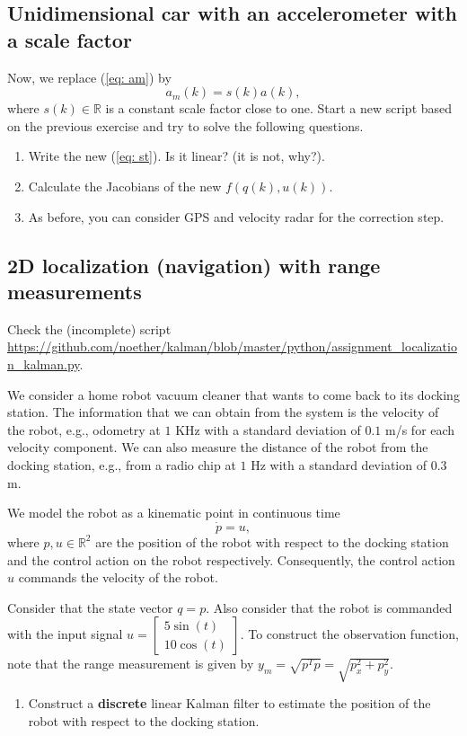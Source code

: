 \documentclass[11pt,a4paper]{article}
\begin{document}
\subsection{Unidimensional car with an accelerometer with a scale factor}
Now, we replace (\ref{eq: am}) by
\begin{equation}
	a_m(k) = s(k)a(k),
\end{equation}
where $s(k)\in\mathbb{R}$ is a constant scale factor close to one.
Start a new script based on the previous exercise and try to solve the following questions.
\begin{enumerate}
	\item Write the new (\ref{eq: st}). Is it linear? (it is not, why?).
	\item Calculate the Jacobians of the new $f(q(k), u(k))$.
	\item As before, you can consider GPS and velocity radar for the correction step.
\end{enumerate}

\subsection{2D localization (navigation) with range measurements}
Check the (incomplete) script \url{https://github.com/noether/kalman/blob/master/python/assignment_localization_kalman.py}.

We consider a home robot vacuum cleaner that wants to come back to its docking station. The information that we can obtain from the system is the velocity of the robot, e.g., odometry at $1$ KHz with a standard deviation of $0.1$ m/s for each velocity component. We can also measure the distance of the robot from the docking station, e.g., from a radio chip at $1$ Hz with a standard deviation of $0.3$ m.

We model the robot as a kinematic point in continuous time
\begin{equation}
\dot p = u,
\end{equation}
where $p,u\in\mathbb{R}^2$ are the position of the robot with respect to the docking station and the control action on the robot respectively. Consequently, the control action $u$ commands the velocity of the robot.

Consider that the state vector $q = p$. Also consider that the robot is commanded with the input signal $u = \begin{bmatrix} 5 \sin(t) \\ 10\cos(t) \end{bmatrix}$. To construct the observation function, note that the range measurement is given by $y_m = \sqrt{p^T p} = \sqrt{p_x^2 + p_y^2}$.

\begin{enumerate}
	\item Construct a {\bf discrete} linear Kalman filter to estimate the position of the robot with respect to the docking station.
\end{enumerate}
\end{document}
